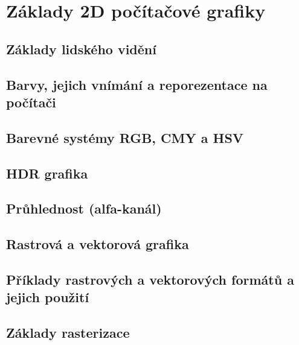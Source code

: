 \documentclass[../../main.tex]{subfiles}
\begin{document}
\section{Základy 2D počítačové grafiky}

\subsection{Základy lidského vidění}
\subsection{Barvy, jejich vnímání a reporezentace na počítači}
\subsection{Barevné systémy RGB, CMY a HSV}
\subsection{HDR grafika}
\subsection{Průhlednost (alfa-kanál)}
\subsection{Rastrová a vektorová grafika}
\subsection{Příklady rastrových a vektorových formátů a jejich použití}
\subsection{Základy rasterizace}
\end{document}
